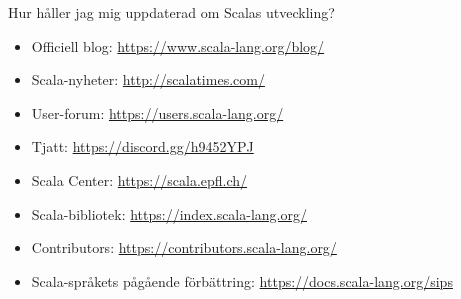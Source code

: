 \begin{Slide}{Hur håller jag mig uppdaterad om Scalas utveckling?}
\begin{itemize}%
  \item Officiell blog: \url{https://www.scala-lang.org/blog/}
  \item Scala-nyheter: \url{http://scalatimes.com/}
  \item User-forum: \url{https://users.scala-lang.org/}
  \item Tjatt: \url{https://discord.gg/h9452YPJ}
  \item Scala Center: \url{https://scala.epfl.ch/}
  \item Scala-bibliotek: \url{https://index.scala-lang.org/}
  \item Contributors: \url{https://contributors.scala-lang.org/}
  \item Scala-språkets pågående förbättring: \url{https://docs.scala-lang.org/sips}
\end{itemize}
\end{Slide}




%
%


